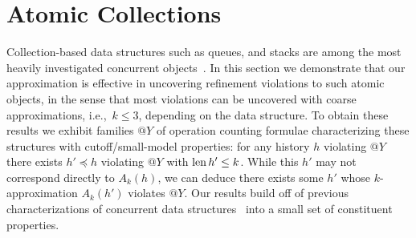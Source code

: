 \section{Atomic Collections}
\label{sec:containers}

Collection-based data structures such as queues, and stacks are among the
most heavily investigated concurrent objects~\cite{chapter/cds/MoirS07}. In
this section we demonstrate that our approximation is effective in uncovering
refinement violations to such atomic objects, in the sense that most violations
can be uncovered with coarse approximations, i.e.,~$k\le 3$, depending on the
data structure. To obtain these results we exhibit families $@Y$ of operation
counting formulae characterizing these structures with cutoff/small-model
properties: for any history $h$ violating $@Y$ there exists $h' \preceq h$
violating $@Y$ with $\operatorname{len} h' \le k$. While this $h'$ may not correspond
directly to $A_k(h)$, we can deduce there exists some $h'$ whose
$k$-approximation $A_k(h')$ violates $@Y$. Our results build off of previous
characterizations of concurrent data structures~\cite{conf/tacas/AbdullaHHJR13,
conf/concur/HenzingerSV13} into a small set of constituent properties.

